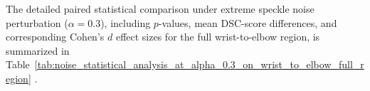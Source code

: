 \documentclass[12pt,letterpaper]{article}
\begin{document}
The detailed paired statistical comparison under extreme speckle noise
perturbation ($\alpha = 0.3$), including $p$-values, mean DSC-score differences,
and corresponding Cohen’s $d$ effect sizes for the full wrist-to-elbow region, is
summarized in Table~\ref{tab:noise_statistical_analysis_at_alpha_0.3_on_wrist_to_elbow_full_region}
.






 
\end{document}
